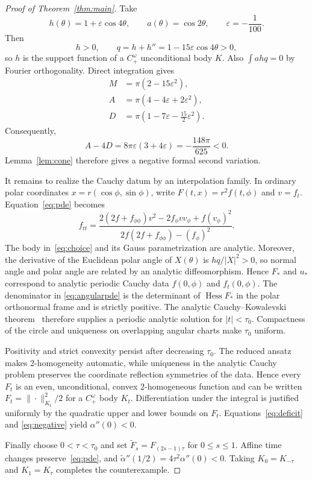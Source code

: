 \documentclass[11pt]{article}
\newcommand{\Hess}{\operatorname{Hess}}
\begin{document}
\begin{proof}[Proof of Theorem~\ref{thm:main}]
Take
\begin{equation}\label{eq:choice}
 h(\theta)=1+\varepsilon\cos4\theta,\qquad
 a(\theta)=\cos2\theta,\qquad \varepsilon=-\frac1{100}.
\end{equation}
Then
\[
 h>0,\qquad q=h+h''=1-15\varepsilon\cos4\theta>0,
\]
so $h$ is the support function of a $C^\omega_+$ unconditional body $K$.
Also $\int ahq=0$ by Fourier orthogonality.  Direct integration gives
\begin{align}
 M&=\pi(2-15\varepsilon^2),\label{eq:M}\\
 A&=\pi(4-4\varepsilon+2\varepsilon^2),\label{eq:A}\\
 D&=\pi\left(1-7\varepsilon-\frac{15}{2}\varepsilon^2\right).
 \label{eq:D}
\end{align}
Consequently,
\begin{equation}\label{eq:negative}
 A-4D=8\pi\varepsilon(3+4\varepsilon)
 =-\frac{148\pi}{625}<0.
\end{equation}
Lemma~\ref{lem:cone} therefore gives a negative formal second variation.

It remains to realize the Cauchy datum by an interpolation family.  In
ordinary polar coordinates $x=r(\cos\phi,\sin\phi)$, write
$F(t,x)=r^2f(t,\phi)$ and $v=f_t$.  Equation~\eqref{eq:pde} becomes
\begin{equation}\label{eq:angularpde}
 f_{tt}=
 \frac{2(2f+f_{\phi\phi})v^2-2f_\phi vv_\phi+f(v_\phi)^2}
 {2f(2f+f_{\phi\phi})-(f_\phi)^2}.
\end{equation}
The body in~\eqref{eq:choice} and its Gauss parametrization are analytic.
Moreover, the derivative of the Euclidean polar angle of $X(\theta)$ is
$hq/|X|^2>0$, so normal angle and polar angle are related by an analytic
diffeomorphism.  Hence $F_*$ and $u_*$ correspond to analytic periodic
Cauchy data $f(0,\phi)$ and $f_t(0,\phi)$.  The denominator in
\eqref{eq:angularpde} is the determinant of $\Hess F_*$ in the polar
orthonormal frame and is strictly positive.  The analytic
Cauchy--Kowalevski theorem~\cite{John} therefore supplies a periodic analytic
solution for $|t|<\tau_0$.  Compactness of the circle and uniqueness on
overlapping angular charts make $\tau_0$ uniform.

Positivity and strict convexity persist after decreasing $\tau_0$.  The
reduced ansatz makes $2$-homogeneity automatic, while uniqueness in the
analytic Cauchy problem preserves the coordinate reflection symmetries of the
data.  Hence every $F_t$ is an even,
unconditional, convex $2$-homogeneous function and can be written
$F_t=\|\cdot\|_{K_t}^2/2$ for a $C^\omega_+$ body $K_t$.
Differentiation under the integral is justified uniformly by the quadratic
upper and lower bounds on $F_t$.  Equations~\eqref{eq:deficit} and
\eqref{eq:negative} yield $\alpha''(0)<0$.

Finally choose $0<\tau<\tau_0$ and set
$\widetilde F_s=F_{(2s-1)\tau}$ for $0\leq s\leq1$.  Affine
time changes preserve~\eqref{eq:pde}, and
$\widetilde\alpha''(1/2)=4\tau^2\alpha''(0)<0$.  Taking
$K_0=K_{-\tau}$ and $K_1=K_\tau$ completes the counterexample.
\end{proof}
\end{document}

